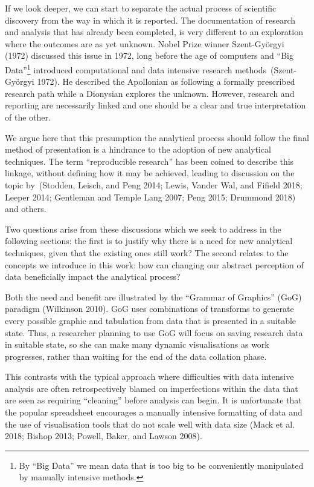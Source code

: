 \documentclass[smallextended]{svjour3}       %
\begin{document}
If we look deeper, we can start to separate the actual process of scientific discovery from the way in which it is reported. The documentation of research and analysis that has already been completed, is very different to an exploration where the outcomes are as yet unknown. Nobel Prize winner Szent-Györgyi (1972) discussed this issue in 1972, long before the age of computers and ``Big Data''\footnote{By ``Big Data'' we mean data that is too big to be conveniently manipulated by manually intensive methods.} introduced computational and data intensive research methods~(Szent-Györgyi 1972). He described the Apollonian as following a formally prescribed research path while a Dionysian explores the unknown. However, research and reporting are necessarily linked and one should be a clear and true interpretation of the other.

We argue here that this presumption the analytical process should follow the final method of presentation is a hindrance to the adoption of new analytical techniques. The term ``reproducible research'' has been coined to describe this linkage, without defining how it may be achieved, leading to discussion on the topic by~(Stodden, Leisch, and Peng 2014; Lewis, Vander Wal, and Fifield 2018; Leeper 2014; Gentleman and Temple Lang 2007; Peng 2015; Drummond 2018) and others.

Two questions arise from these discussions which we seek to address in the following sections: the first is to justify why there is a need for new analytical techniques, given that the existing ones still work? The second relates to the concepts we introduce in this work: how can changing our abstract perception of data beneficially impact the analytical process?

Both the need and benefit are illustrated by the ``Grammar of Graphics'' (GoG) paradigm (Wilkinson 2010). GoG uses combinations of transforms to generate every possible graphic and tabulation from data that is presented in a suitable state. Thus, a researcher planning to use GoG will focus on saving research data in suitable state, so she can make many dynamic visualisations as work progresses, rather than waiting for the end of the data collation phase.

This contrasts with the typical approach where difficulties with data intensive analysis are often retrospectively blamed on imperfections within the data that are seen as requiring ``cleaning'' before analysis can begin. It is unfortunate that the popular spreadsheet encourages a manually intensive formatting of data and the use of visualisation tools that do not scale well with data size (Mack et al. 2018; Bishop 2013; Powell, Baker, and Lawson 2008).
\end{document}
